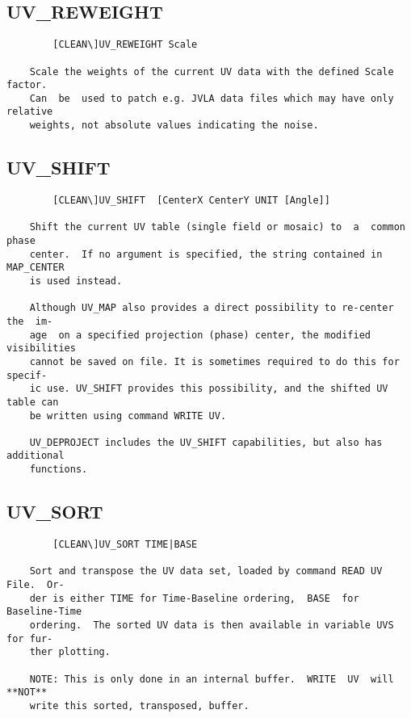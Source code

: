\subsection{UV\_REWEIGHT}
\begin{verbatim}
        [CLEAN\]UV_REWEIGHT Scale

    Scale the weights of the current UV data with the defined Scale  factor.
    Can  be  used to patch e.g. JVLA data files which may have only relative
    weights, not absolute values indicating the noise.

\end{verbatim}
\subsection{UV\_SHIFT}
\begin{verbatim}
        [CLEAN\]UV_SHIFT  [CenterX CenterY UNIT [Angle]]

    Shift the current UV table (single field or mosaic) to  a  common  phase
    center.  If no argument is specified, the string contained in MAP_CENTER
    is used instead.

    Although UV_MAP also provides a direct possibility to re-center the  im-
    age  on a specified projection (phase) center, the modified visibilities
    cannot be saved on file. It is sometimes required to do this for specif-
    ic use. UV_SHIFT provides this possibility, and the shifted UV table can
    be written using command WRITE UV.

    UV_DEPROJECT includes the UV_SHIFT capabilities, but also has additional
    functions.

\end{verbatim}
\subsection{UV\_SORT}
\begin{verbatim}
        [CLEAN\]UV_SORT TIME|BASE

    Sort and transpose the UV data set, loaded by command READ UV File.  Or-
    der is either TIME for Time-Baseline ordering,  BASE  for  Baseline-Time
    ordering.  The sorted UV data is then available in variable UVS for fur-
    ther plotting.

    NOTE: This is only done in an internal buffer.  WRITE  UV  will  **NOT**
    write this sorted, transposed, buffer.

\end{verbatim}
